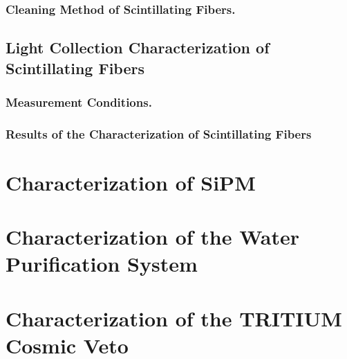 \documentclass[12pt,a4paper]{book}
\begin{document}
			\subsubsection{Cleaning Method of Scintillating Fibers.}\label{subsubsec:CleaningProcess}
			
			
		\subsection{Light Collection Characterization of Scintillating Fibers}\label{subsec:CharacterizationFibers}
		
		
			\subsubsection{Measurement Conditions.}\label{subsubsec:CharacterizationSystem}
			
		
			\subsubsection{Results of the Characterization of Scintillating Fibers}\label{subsubsec:CharacterizationFibers}
			
				
	\section[Characterization of the SiPM]{Characterization of SiPM}\label{sec:CharacterizationSiPM}
	
	
	\section{Characterization of the Water Purification System}\label{sec:CharacterizationUltraPureWaterSystem}
	
					 
	\section[Characterization of the Cosmic Veto]{Characterization of the TRITIUM Cosmic Veto}\label{sec:TritiumActiveVeto}
	
\end{document}
